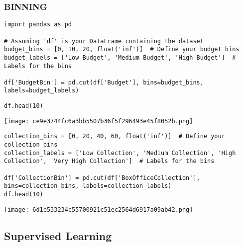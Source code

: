 \documentclass[11pt]{article}
\begin{document}
\subsubsection{BINNING}
\label{sec:org8da8abe}
\begin{verbatim}
import pandas as pd

# Assuming 'df' is your DataFrame containing the dataset
budget_bins = [0, 10, 20, float('inf')]  # Define your budget bins
budget_labels = ['Low Budget', 'Medium Budget', 'High Budget']  # Labels for the bins

df['BudgetBin'] = pd.cut(df['Budget'], bins=budget_bins, labels=budget_labels)
\end{verbatim}

\begin{verbatim}
df.head(10)
\end{verbatim}

\begin{center}
\texttt{[image: ce9e3744fc6a3bb5507b36f5f296493e45f8052b.png]}
\end{center}

\begin{verbatim}
collection_bins = [0, 20, 40, 60, float('inf')]  # Define your collection bins
collection_labels = ['Low Collection', 'Medium Collection', 'High Collection', 'Very High Collection']  # Labels for the bins

df['CollectionBin'] = pd.cut(df['BoxOfficeCollection'], bins=collection_bins, labels=collection_labels)
df.head(10)
\end{verbatim}
\begin{center}
\texttt{[image: 6d1b533234c55700921c51ec2564d6917a09ab42.png]}
\end{center}
\subsection{Supervised Learning}
\label{sec:org9890fbd}
\end{document}
